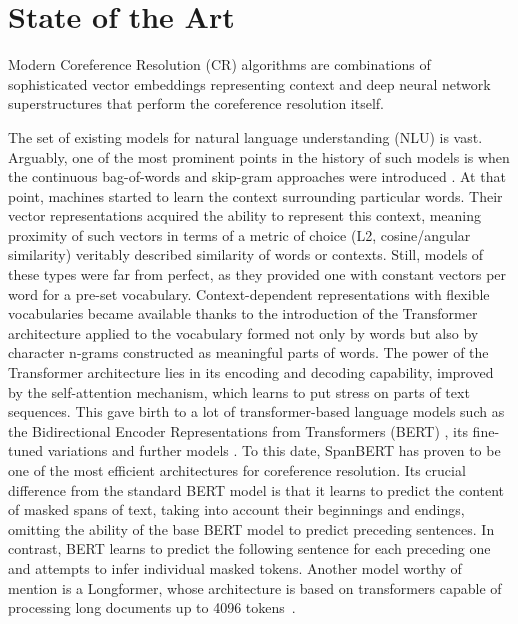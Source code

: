 \section{State of the Art}\label{sec:sota}

Modern Coreference Resolution (CR) algorithms are combinations of sophisticated vector embeddings representing context and deep neural network superstructures that perform the coreference resolution itself. 

The set of existing models for natural language understanding (NLU)  is vast. 
Arguably, one of the most prominent points in the history of such models is when the continuous bag-of-words and skip-gram approaches were introduced \cite{w2v-Mikolov2013}. 
At that point, machines started to learn the context surrounding particular words. Their vector representations acquired the ability to represent this context, meaning proximity of such vectors in terms of a metric of choice (L2, cosine/angular similarity) veritably described similarity of words or contexts. 
Still, models of these types were far from perfect, as they provided one with constant vectors per word for a pre-set vocabulary. 
Context-dependent representations with flexible vocabularies became available thanks to the introduction of the Transformer architecture \cite{transformer-Vaswani2017} applied to the vocabulary formed not only by words but also by character n-grams constructed as meaningful parts of words.  
The power of the Transformer architecture lies in its encoding and decoding capability, improved by the self-attention mechanism, which learns to put stress on parts of text sequences. 
This gave birth to a lot of transformer-based language models such as the Bidirectional Encoder Representations from Transformers (BERT) \cite{bert-Devlin2019}, its fine-tuned variations \cite{albert-Lan2020,robarta-Liu2019} and further models \cite{gpt-Radford2018,use-Cer2018}. 
To this date, SpanBERT \cite{cr-Joshi2019} has proven to be one of the most efficient architectures for coreference resolution. 
Its crucial difference from the standard BERT model is that it learns to predict the content of masked spans of text, taking into account their beginnings and endings, omitting the ability of the base BERT model to predict preceding sentences. In contrast, BERT learns to predict the following sentence for each preceding one and attempts to infer individual masked tokens.
Another model worthy of mention is a Longformer, whose architecture is based on transformers capable of processing long documents up to 4096 tokens~\cite{Beltagy2020Longformer}.

